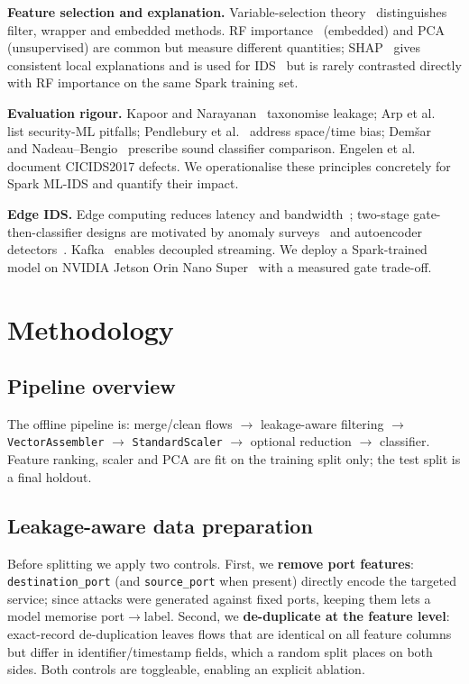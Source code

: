 \documentclass[runningheads]{llncs}
\begin{document}
\textbf{Feature selection and explanation.} Variable-selection theory~\cite{guyon2003introduction} distinguishes filter, wrapper and embedded methods. RF importance~\cite{breiman2001random} (embedded) and PCA~\cite{jolliffe2002pca} (unsupervised) are common but measure different quantities; SHAP~\cite{lundberg2017unified} gives consistent local explanations and is used for IDS~\cite{sarhan2022explainable} but is rarely contrasted directly with RF importance on the same Spark training set.

\textbf{Evaluation rigour.} Kapoor and Narayanan~\cite{kapoor2023leakage} taxonomise leakage; Arp et al.~\cite{arp2022dos} list security-ML pitfalls; Pendlebury et al.~\cite{pendlebury2019tesseract} address space/time bias; Dem{\v{s}}ar~\cite{demsar2006statistical} and Nadeau--Bengio~\cite{nadeau2003inference} prescribe sound classifier comparison. Engelen et al.~\cite{engelen2021troubleshooting} document CICIDS2017 defects. We operationalise these principles concretely for Spark ML-IDS and quantify their impact.

\textbf{Edge IDS.} Edge computing reduces latency and bandwidth~\cite{shi2016edge}; two-stage gate-then-classifier designs are motivated by anomaly surveys~\cite{chandola2009anomaly} and autoencoder detectors~\cite{lopez2020autoencoder}. Kafka~\cite{kreps2011kafka} enables decoupled streaming. We deploy a Spark-trained model on NVIDIA Jetson Orin Nano Super~\cite{nvidia2019jetson} with a measured gate trade-off.

\section{Methodology}
\label{sec:method}

\subsection{Pipeline overview}
The offline pipeline is: merge/clean flows $\rightarrow$ leakage-aware filtering $\rightarrow$ \texttt{VectorAssembler} $\rightarrow$ \texttt{StandardScaler} $\rightarrow$ optional reduction $\rightarrow$ classifier. Feature ranking, scaler and PCA are fit on the training split only; the test split is a final holdout.

\subsection{Leakage-aware data preparation}
\label{sec:leakage}
Before splitting we apply two controls. First, we \textbf{remove port features}: \texttt{destination\_port} (and \texttt{source\_port} when present) directly encode the targeted service; since attacks were generated against fixed ports, keeping them lets a model memorise port$\rightarrow$label. Second, we \textbf{de-duplicate at the feature level}: exact-record de-duplication leaves flows that are identical on all feature columns but differ in identifier/timestamp fields, which a random split places on both sides. Both controls are toggleable, enabling an explicit ablation.
\end{document}
